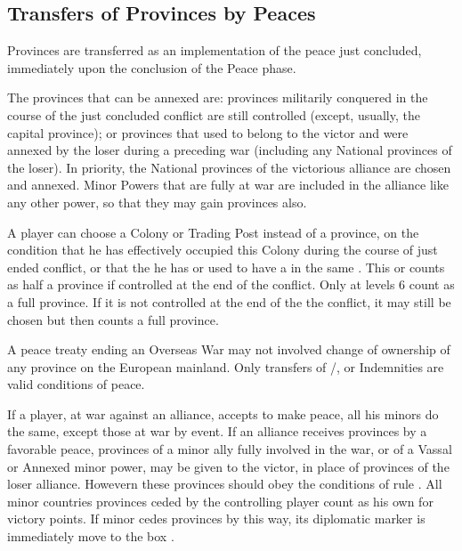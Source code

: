 \subsection{Transfers of Provinces by Peaces}\label{chSpecific:Tranfer
  Provinces Peace}

\aparag Provinces are transferred as an implementation of the peace just
concluded, immediately upon the conclusion of the Peace phase.

The provinces that can be annexed are:
\bparag provinces militarily conquered in the course of the just concluded
conflict are still controlled (except, usually, the capital province);
\bparag or provinces that used to belong to the victor and were annexed by the
loser during a preceding war (including any National provinces of the loser).
\bparag In priority, the National provinces of the victorious alliance are
chosen and annexed.
\bparag Minor Powers that are fully at war are included in the alliance like
any other power, so that they may gain provinces also.

A player can choose a Colony or Trading Post instead of a province, on the
condition that he has effectively occupied this Colony during the course of
just ended conflict, or that the he has or used to have a \COL in the same
.
\bparag This \COL or \TP counts as half a province if controlled at the end of
the conflict.  Only \COL at levels 6 count as a full province.
\bparag If it is not controlled at the end of the the conflict, it may still
be chosen but then counts a full province.

A peace treaty ending an Overseas War may not involved change of ownership of
any province on the European mainland. Only transfers of \TP/\COL, %
or Indemnities are valid conditions of peace.

If a player, at war against an alliance, accepts to make peace, all his minors
do the same, except those at war by event.
\bparag If an alliance receives provinces by a favorable peace, provinces of a
minor ally fully involved in the war, or of a Vassal or Annexed minor power,
may be given to the victor, in place of provinces of the loser
alliance. Howevern these provinces should obey the conditions of rule
.
\bparag All minor countries provinces ceded by the controlling player count as
his own for victory points.
\bparag If minor cedes provinces by this way, its diplomatic marker is
immediately move to the box \Neutral.



